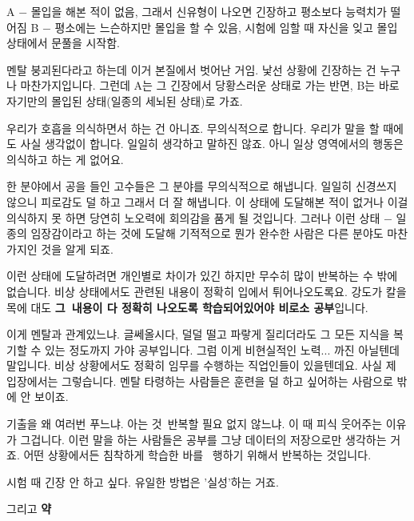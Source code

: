 A $-$ 몰입을 해본 적이 없음, 그래서 신유형이 나오면 긴장하고 평소보다 능력치가 떨어짐
B $-$ 평소에는 느슨하지만 몰입을 할 수 있음, 시험에 임할 때 자신을 잊고 몰입 상태에서 문풀을 시작함.
\vspace{5mm}

멘탈 붕괴된다라고 하는데 이거 본질에서 벗어난 거임.
낯선 상황에 긴장하는 건 누구나 마찬가지입니다.
그런데 A는 그 긴장에서 당황스러운 상태로 가는 반면, B는 바로 자기만의 몰입된 상태(일종의 세뇌된 상태)로 가죠.
\vspace{5mm}

우리가 호흡을 의식하면서 하는 건 아니죠. 무의식적으로 합니다.
우리가 말을 할 때에도 사실 생각없이 합니다. 일일히 생각하고 말하진 않죠.
아니 일상 영역에서의 행동은 의식하고 하는 게 없어요.
\vspace{5mm}

한 분야에서 공을 들인 고수들은 그 분야를 무의식적으로 해냅니다. 일일히 신경쓰지 않으니 피로감도 덜 하고 그래서 더 잘 해냅니다.
이 상태에 도달해본 적이 없거나 이걸 의식하지 못 하면 당연히 노오력에 회의감을 품게 될 것입니다.
그러나 이런 상태 $-$ 일종의 임장감이라고 하는 것에 도달해 기적적으로 뭔가 완수한 사람은 다른 분야도 마찬가지인 것을 알게 되죠.
\vspace{5mm}

이런 상태에 도달하려면 개인별로 차이가 있긴 하지만 무수히 많이 반복하는 수 밖에 없습니다.
비상 상태에서도 관련된 내용이 정확히 입에서 튀어나오도록요.
강도가 칼을 목에 대도 \textbf{그 내용이 다 정확히 나오도록 학습되어있어야 비로소 공부}입니다.
\vspace{5mm}

이게 멘탈과 관계있느냐. 글쎄올시다, 덜덜 떨고 파랗게 질리더라도 그 모든 지식을 복기할 수 있는 정도까지 가야 공부입니다.
그럼 이게 비현실적인 노력... 까진 아닐텐데 말입니다. 비상 상황에서도 정확히 임무를 수행하는 직업인들이 있을텐데요.
사실 제 입장에서는 그렇습니다. 멘탈 타령하는 사람들은 훈련을 덜 하고 싶어하는 사람으로 밖에 안 보이죠.
\vspace{5mm}

기출을 왜 여러번 푸느냐. 아는 것 반복할 필요 없지 않느냐.
이 때 피식 웃어주는 이유가 그겁니다. 이런 말을 하는 사람들은 공부를 그냥 데이터의 저장으로만 생각하는 거죠.
어떤 상황에서든 침착하게 학습한 바를  행하기 위해서 반복하는 것입니다.
\vspace{5mm}

시험 때 긴장 안 하고 싶다. 유일한 방법은 '실성'하는 거죠.
\vspace{5mm}

그리고 \textbf{약}
\vspace{5mm}

